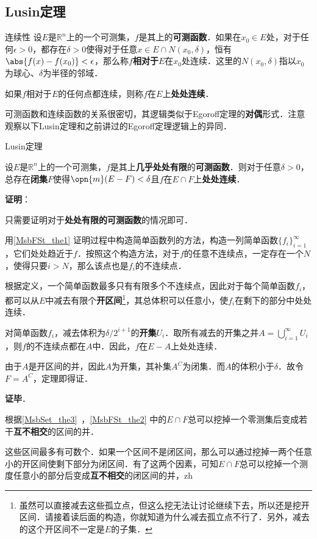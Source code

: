 \subsection{Lusin定理}

\begin{definition}{连续性}
设$E$是$\mathbb{R}^n$上的一个可测集，$f$是其上的\textbf{可测函数}．如果在$x_0\in E$处，对于任何$\epsilon>0$，都存在$\delta>0$使得对于任意$x\in E\cap N(x_0, \delta)$，恒有$\abs{f(x)-f(x_0)}<\epsilon$，那么称$f$\textbf{相对于}$E$在$x_0$处连续．这里的$N(x_0, \delta)$指以$x_0$为球心、$\delta$为半径的邻域．

如果$f$相对于$E$的任何点都连续，则称$f$在$E$上\textbf{处处连续}．
\end{definition}

可测函数和连续函数的关系很密切，其逻辑类似于Egoroff定理的\textbf{对偶}形式．注意观察以下Lusin定理和之前讲过的Egoroff定理逻辑上的异同．

\begin{theorem}{Lusin定理}\label{MsbFSt_the2}

设$E$是$\mathbb{R}^n$上的一个可测集，$f$是其上\textbf{几乎处处有限}的\textbf{可测函数}．则对于任意$\delta>0$，总存在\textbf{闭集}$F$使得$\opn{m}(E-F)<\delta$且$f$在$E\cap F$上\textbf{处处连续}．

\end{theorem}

\textbf{证明}：

只需要证明对于\textbf{处处有限的可测函数}的情况即可．

用\autoref{MsbFSt_the1}  证明过程中构造简单函数列的方法，构造一列简单函数$\{f_i\}_{i=1}^\infty$，它们处处趋近于$f$．按照这个构造方法，对于$f$的任意不连续点，一定存在一个$N$，使得只要$i>N$，那么该点也是$f_i$的不连续点．

根据定义，一个简单函数最多只有有限多个不连续点，因此对于每个简单函数$f_i$，都可以从$E$中减去有限个\textbf{开区间}\footnote{虽然可以直接减去这些孤立点，但这么挖无法让讨论继续下去，所以还是挖开区间．请接着读后面的构造，你就知道为什么减去孤立点不行了．另外，减去的这个开区间不一定是$E$的子集．}，其总体积可以任意小，使$f_i$在剩下的部分中处处连续．

对简单函数$f_i$，减去体积为$\delta/2^{i+1}$的\textbf{开集}$U_i$．取所有减去的开集之并$A=\bigcup_{i=1}^\infty U_i$，则$f$的不连续点都在$A$中．因此，$f$在$E-A$上处处连续．

由于$A$是开区间的并，因此$A$为开集，其补集$A^C$为闭集．而$A$的体积小于$\delta$．故令$F=A^C$，定理即得证．

\textbf{证毕}．

根据\autoref{MsbSet_the3}~，\autoref{MsbFSt_the2} 中的$E\cap F$总可以挖掉一个零测集后变成若干\textbf{互不相交}的区间的并．

这些区间最多有可数个．如果一个区间不是闭区间，那么可以通过挖掉一两个任意小的开区间使剩下部分为闭区间．有了这两个因素，可知$E\cap F$总可以挖掉一个测度任意小的部分后变成\textbf{互不相交}的闭区间的并，zh
















